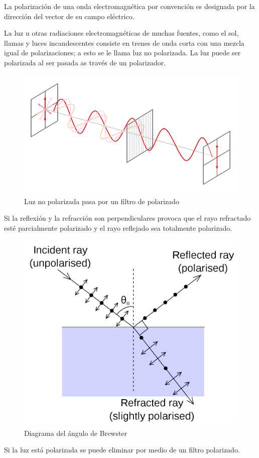 \documentclass{article}
\begin{document}
La polarización de una onda electromagnética por convención es designada por la dirección del vector de su campo eléctrico.

La luz u otras radiaciones electromagnéticas de muchas fuentes, como el sol, llamas y luces incandescentes consiste en trenes de onda corta con una mezcla igual de polarizaciones; a esto se le llama luz no polarizada. La luz puede ser polarizada al ser pasada as través de un polarizador.

\begin{figure}[H]
	\centering
	\includegraphics[width=0.65\linewidth]{Figuras/Polarizador}
	\caption{Luz no polarizada pasa por un filtro de polarizado}
	\label{fig:polarizador}
\end{figure}

Si la reflexión y la refracción son perpendiculares provoca que el rayo refractado esté parcialmente polarizado y el rayo reflejado sea totalmente polarizado.


\begin{figure}[H]
	\centering
	\includegraphics[width=0.60\linewidth]{Figuras/Brewsters_Angle}
	\caption{Diagrama del ángulo de Brewster}
	\label{fig:brewstersangle}
\end{figure}


Si la luz está polarizada se puede eliminar por medio de un filtro polarizado.
\end{document}
